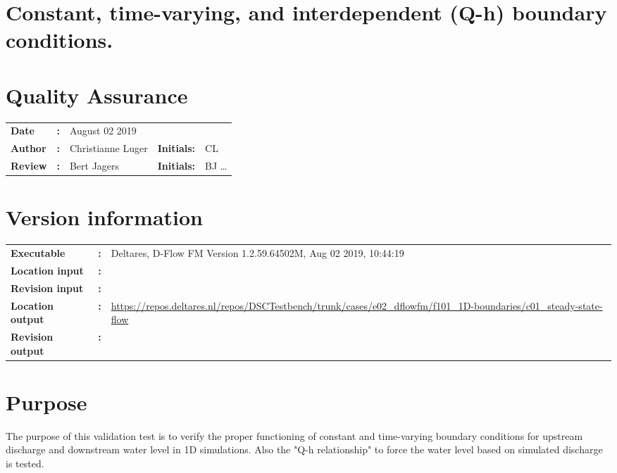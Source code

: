 

\section{Constant, time-varying, and interdependent (Q-h) boundary conditions.}
\newrefsegment

\section*{Quality Assurance}
\begin{tabular}{@{}p{27mm}@{}p{0mm}p{\textwidth-52mm-48pt}p{15mm}p{10mm}}
\textbf{Date} & \textbf{:} &   August 02 2019\\ 
\textbf{Author} & \textbf{:} & Christianne Luger  & \textbf{Initials:} & CL \\
\textbf{Review} & \textbf{:} & Bert Jagers & \textbf{Initials:} & BJ \ldots 
\end{tabular}

\section*{Version information}
{{
\begin{tabular}{@{}p{27mm}@{}p{0mm}p{\textwidth-27mm-24pt}}
\textbf{Executable}   & \textbf{:} & Deltares, D-Flow FM Version 1.2.59.64502M, Aug 02 2019, 10:44:19  \\
\textbf{Location input}     & \textbf{:} & \\
\textbf{Revision input} & \textbf{:} &  \\
\textbf{Location output}     & \textbf{:} & \url{https://repos.deltares.nl/repos/DSCTestbench/trunk/cases/e02_dflowfm/f101_1D-boundaries/c01_steady-state-flow} \\
\textbf{Revision output} & \textbf{:} & 
\end{tabular}
}}

\section*{Purpose}
The purpose of this validation test is to verify the proper functioning of constant and time-varying boundary conditions for upstream discharge and downstream water level in 1D \dflowfmfull simulations.
Also the "Q-h relationship" to force the water level based on simulated discharge is tested.

